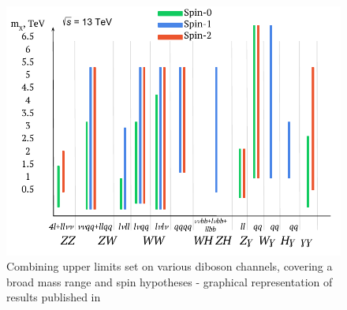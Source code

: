 \documentclass{PoS}
\begin{document}
  \begin{figure}
    \begin{center} 
\vspace*{-5mm}
    \includegraphics[width=.5\textwidth]{figures/lim_sketch}
    \end{center}
\vspace*{-8mm}
     \caption{Combining upper limits set on various diboson channels, covering a broad mass range and spin hypotheses - graphical representation of results published in \cite{HIGG-2016-31,HIGG-2016-19,ATLAS-CONF-2018-016,EXOT-2016-30,EXOT-2016-29,EXOT-2016-28,HIGG-2016-17,EXOT-2016-10-2}}
     \label{fig:summary}
     \end{figure}

\vspace*{-6mm}


%
\end{document}
